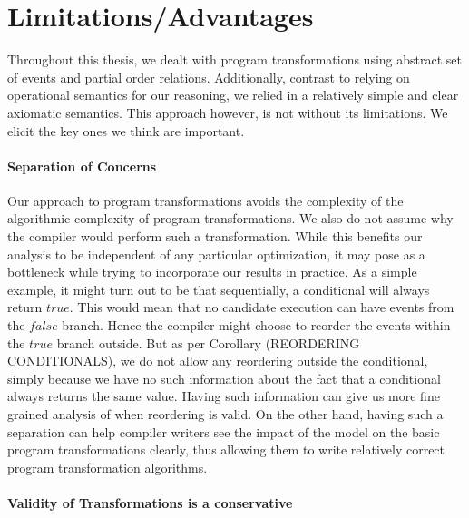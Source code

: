 \section{Limitations/Advantages}

    Throughout this thesis, we dealt with program transformations using abstract set of events and partial order relations. 
    Additionally, contrast to relying on operational semantics for our reasoning, we relied in a relatively simple and clear axiomatic semantics. 
    This approach however, is not without its limitations. 
    We elicit the key ones we think are important. 

    \paragraph{Separation of Concerns}

    Our approach to program transformations avoids the complexity of the algorithmic complexity of program transformations. 
    We also do not assume why the compiler would perform such a transformation.
    While this benefits our analysis to be independent of any particular optimization, it may pose as a bottleneck while trying to incorporate our results in practice. 
    As a simple example, it might turn out to be that sequentially, a conditional will always return $true$. This would mean that no candidate execution can have events from the $false$ branch. Hence the compiler might choose to reorder the events within the $true$ branch outside. 
    But as per Corollary (REORDERING CONDITIONALS), we do not allow any reordering outside the conditional, simply because we have no such information about the fact that a conditional always returns the same value. 
    Having such information can give us more fine grained analysis of when reordering is valid. 
    On the other hand, having such a separation can help compiler writers see the impact of the model on the basic program transformations clearly, thus allowing them to write relatively correct program transformation algorithms. 

    \paragraph{Validity of Transformations is a conservative}


